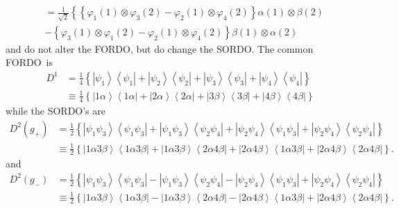 \documentclass[aps,preprint]{revtex4}%
\begin{document}
\begin{align}
&  =\frac{1}{\sqrt{2}}\left\{  \left\{  \varphi_{1}\left(  1\right)
\otimes\varphi_{3}\left(  2\right)  -\varphi_{2}\left(  1\right)
\otimes\varphi_{4}\left(  2\right)  \right\}  \alpha\left(  1\right)
\otimes\beta\left(  2\right)  \right. \nonumber\\
&  -\left\{  \varphi_{3}\left(  1\right)  \otimes\varphi_{1}\left(  2\right)
-\varphi_{2}\left(  1\right)  \otimes\varphi_{4}\left(  2\right)  \right\}
\beta\left(  1\right)  \otimes\alpha\left(  2\right)
\end{align}
and do not alter the FORDO, but do change the SORDO. The common FORDO\ is
\begin{align}
D^{1}  &  =\frac{1}{4}\left\{  \left\vert \psi_{1}\right\rangle \left\langle
\psi_{1}\right\vert +\left\vert \psi_{2}\right\rangle \left\langle \psi
_{2}\right\vert +\left\vert \psi_{3}\right\rangle \left\langle \psi
_{3}\right\vert +\left\vert \psi_{4}\right\rangle \left\langle \psi
_{4}\right\vert \right\} \nonumber\\
&  \equiv\frac{1}{4}\left\{  \left\vert 1\alpha\right\rangle \left\langle
1\alpha\right\vert +\left\vert 2\alpha\right\rangle \left\langle
2\alpha\right\vert +\left\vert 3\beta\right\rangle \left\langle 3\beta
\right\vert +\left\vert 4\beta\right\rangle \left\langle 4\beta\right\vert
\right\}
\end{align}
while the SORDO's are
\begin{align}
D^{2}\left(  g_{+}\right)   &  =\frac{1}{2}\left\{  \left\vert \psi_{1}%
\psi_{3}\right\rangle \left\langle \psi_{1}\psi_{3}\right\vert +\left\vert
\psi_{1}\psi_{3}\right\rangle \left\langle \psi_{2}\psi_{4}\right\vert
+\left\vert \psi_{2}\psi_{4}\right\rangle \left\langle \psi_{1}\psi
_{3}\right\vert +\left\vert \psi_{2}\psi_{4}\right\rangle \left\langle
\psi_{2}\psi_{4}\right\vert \right\} \nonumber\\
&  \equiv\frac{1}{2}\left\{  \left\vert 1\alpha3\beta\right\rangle
\left\langle 1\alpha3\beta\right\vert +\left\vert 1\alpha3\beta\right\rangle
\left\langle 2\alpha4\beta\right\vert +\left\vert 2\alpha4\beta\right\rangle
\left\langle 1\alpha3\beta\right\vert +\left\vert 2\alpha4\beta\right\rangle
\left\langle 2\alpha4\beta\right\vert \right\}  .
\end{align}
and
\begin{align}
D^{2}\left(  g_{-}\right)   &  =\frac{1}{2}\left\{  \left\vert \psi_{1}%
\psi_{3}\right\rangle \left\langle \psi_{1}\psi_{3}\right\vert -\left\vert
\psi_{1}\psi_{3}\right\rangle \left\langle \psi_{2}\psi_{4}\right\vert
-\left\vert \psi_{2}\psi_{4}\right\rangle \left\langle \psi_{1}\psi
_{3}\right\vert +\left\vert \psi_{2}\psi_{4}\right\rangle \left\langle
\psi_{2}\psi_{4}\right\vert \right\} \nonumber\\
&  \equiv\frac{1}{2}\left\{  \left\vert 1\alpha3\beta\right\rangle
\left\langle 1\alpha3\beta\right\vert -\left\vert 1\alpha3\beta\right\rangle
\left\langle 2\alpha4\beta\right\vert -\left\vert 2\alpha4\beta\right\rangle
\left\langle 1\alpha3\beta\right\vert +\left\vert 2\alpha4\beta\right\rangle
\left\langle 2\alpha4\beta\right\vert \right\}  .
\end{align}
\end{document}
